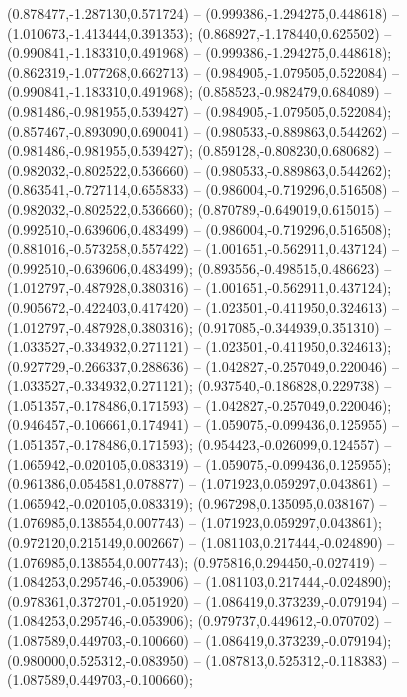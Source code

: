  (0.878477,-1.287130,0.571724) -- (0.999386,-1.294275,0.448618) -- (1.010673,-1.413444,0.391353);
 (0.868927,-1.178440,0.625502) -- (0.990841,-1.183310,0.491968) -- (0.999386,-1.294275,0.448618);
 (0.862319,-1.077268,0.662713) -- (0.984905,-1.079505,0.522084) -- (0.990841,-1.183310,0.491968);
 (0.858523,-0.982479,0.684089) -- (0.981486,-0.981955,0.539427) -- (0.984905,-1.079505,0.522084);
 (0.857467,-0.893090,0.690041) -- (0.980533,-0.889863,0.544262) -- (0.981486,-0.981955,0.539427);
 (0.859128,-0.808230,0.680682) -- (0.982032,-0.802522,0.536660) -- (0.980533,-0.889863,0.544262);
 (0.863541,-0.727114,0.655833) -- (0.986004,-0.719296,0.516508) -- (0.982032,-0.802522,0.536660);
 (0.870789,-0.649019,0.615015) -- (0.992510,-0.639606,0.483499) -- (0.986004,-0.719296,0.516508);
 (0.881016,-0.573258,0.557422) -- (1.001651,-0.562911,0.437124) -- (0.992510,-0.639606,0.483499);
 (0.893556,-0.498515,0.486623) -- (1.012797,-0.487928,0.380316) -- (1.001651,-0.562911,0.437124);
 (0.905672,-0.422403,0.417420) -- (1.023501,-0.411950,0.324613) -- (1.012797,-0.487928,0.380316);
 (0.917085,-0.344939,0.351310) -- (1.033527,-0.334932,0.271121) -- (1.023501,-0.411950,0.324613);
 (0.927729,-0.266337,0.288636) -- (1.042827,-0.257049,0.220046) -- (1.033527,-0.334932,0.271121);
 (0.937540,-0.186828,0.229738) -- (1.051357,-0.178486,0.171593) -- (1.042827,-0.257049,0.220046);
 (0.946457,-0.106661,0.174941) -- (1.059075,-0.099436,0.125955) -- (1.051357,-0.178486,0.171593);
 (0.954423,-0.026099,0.124557) -- (1.065942,-0.020105,0.083319) -- (1.059075,-0.099436,0.125955);
 (0.961386,0.054581,0.078877) -- (1.071923,0.059297,0.043861) -- (1.065942,-0.020105,0.083319);
 (0.967298,0.135095,0.038167) -- (1.076985,0.138554,0.007743) -- (1.071923,0.059297,0.043861);
 (0.972120,0.215149,0.002667) -- (1.081103,0.217444,-0.024890) -- (1.076985,0.138554,0.007743);
 (0.975816,0.294450,-0.027419) -- (1.084253,0.295746,-0.053906) -- (1.081103,0.217444,-0.024890);
 (0.978361,0.372701,-0.051920) -- (1.086419,0.373239,-0.079194) -- (1.084253,0.295746,-0.053906);
 (0.979737,0.449612,-0.070702) -- (1.087589,0.449703,-0.100660) -- (1.086419,0.373239,-0.079194);
 (0.980000,0.525312,-0.083950) -- (1.087813,0.525312,-0.118383) -- (1.087589,0.449703,-0.100660);
